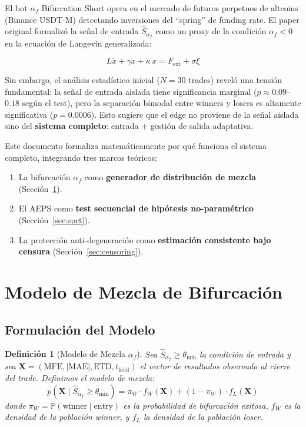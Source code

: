 \documentclass[11pt,a4paper]{article}
\newtheorem{definition}{Definici\'on}[section]
\newcommand{\af}{\alpha_f}
\newcommand{\score}{\hat{S}_{\alpha_f}}
\newcommand{\Prob}{\mathbb{P}}
\begin{document}
El bot $\af$ Bifurcation Short opera en el mercado de futuros perpetuos
de altcoins (Binance USDT-M) detectando inversiones del ``spring''
de funding rate. El paper original \cite{epeloa2026bifurcation}
formaliz\'o la se\~nal de entrada $\score$ como un proxy de la condici\'on
$\af < 0$ en la ecuaci\'on de Langevin generalizada:

\begin{equation}
L\ddot{x} + \gamma\dot{x} + \kappa\,x = F_{\text{ext}} + \sigma\xi
\label{eq:langevin}
\end{equation}

Sin embargo, el an\'alisis estad\'istico inicial ($N=30$ trades)
revel\'o una tensi\'on fundamental: la se\~nal de entrada aislada
tiene significancia marginal ($p \approx 0.09$--$0.18$ seg\'un el test),
pero la separaci\'on bimodal entre winners y losers es altamente
significativa ($p = 0.0006$). Esto sugiere que el edge no proviene
de la se\~nal aislada sino del \textbf{sistema completo}: entrada +
gesti\'on de salida adaptativa.

Este documento formaliza matem\'aticamente por qu\'e funciona el
sistema completo, integrando tres marcos te\'oricos:

\begin{enumerate}[leftmargin=2em]
\item La bifurcaci\'on $\af$ como \textbf{generador de distribuci\'on
  de mezcla} (Secci\'on~\ref{sec:mixture}).
\item El AEPS como \textbf{test secuencial de hip\'otesis no-param\'etrico}
  (Secci\'on~\ref{sec:sprt}).
\item La protecci\'on anti-degeneraci\'on como \textbf{estimaci\'on
  consistente bajo censura} (Secci\'on~\ref{sec:censoring}).
\end{enumerate}


\section{Modelo de Mezcla de Bifurcaci\'on}
\label{sec:mixture}

\subsection{Formulaci\'on del Modelo}

\begin{definition}[Modelo de Mezcla $\af$]
\label{def:mixture}
Sea $\score \geq \theta_{\min}$ la condici\'on de entrada y sea
$\bm{X} = (\text{MFE}, |\text{MAE}|, \text{ETD}, t_{\text{hold}})$
el vector de resultados observado al cierre del trade. Definimos
el modelo de mezcla:
\begin{equation}
p(\bm{X} \mid \score \geq \theta_{\min}) =
  \pi_W \cdot f_W(\bm{X}) + (1 - \pi_W) \cdot f_L(\bm{X})
\label{eq:mixture}
\end{equation}
donde $\pi_W = \Prob(\text{winner} \mid \text{entry})$ es la
probabilidad de bifurcaci\'on exitosa, $f_W$ es la densidad
de la poblaci\'on winner, y $f_L$ la densidad de la poblaci\'on loser.
\end{definition}
\end{document}
